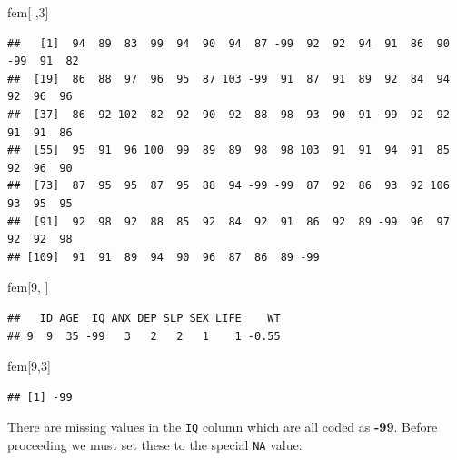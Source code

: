 \documentclass[
  12pt,
]{book}
\newenvironment{Shaded}{\begin{snugshade}}{\end{snugshade}}
\newcommand{\ConstantTok}[1]{\textcolor[rgb]{0.00,0.00,0.00}{#1}}
\newcommand{\DecValTok}[1]{\textcolor[rgb]{0.00,0.00,0.81}{#1}}
\newcommand{\NormalTok}[1]{#1}
\newcommand{\OtherTok}[1]{\textcolor[rgb]{0.56,0.35,0.01}{#1}}
\newcommand{\SpecialCharTok}[1]{\textcolor[rgb]{0.00,0.00,0.00}{#1}}
\begin{document}
\begin{Shaded}
\begin{Highlighting}[]
\NormalTok{fem[ ,}\DecValTok{3}\NormalTok{]}
\end{Highlighting}
\end{Shaded}

\begin{verbatim}
##   [1]  94  89  83  99  94  90  94  87 -99  92  92  94  91  86  90 -99  91  82
##  [19]  86  88  97  96  95  87 103 -99  91  87  91  89  92  84  94  92  96  96
##  [37]  86  92 102  82  92  90  92  88  98  93  90  91 -99  92  92  91  91  86
##  [55]  95  91  96 100  99  89  89  98  98 103  91  91  94  91  85  92  96  90
##  [73]  87  95  95  87  95  88  94 -99 -99  87  92  86  93  92 106  93  95  95
##  [91]  92  98  92  88  85  92  84  92  91  86  92  89 -99  96  97  92  92  98
## [109]  91  91  89  94  90  96  87  86  89 -99
\end{verbatim}

\begin{Shaded}
\begin{Highlighting}[]
\NormalTok{fem[}\DecValTok{9}\NormalTok{, ]}
\end{Highlighting}
\end{Shaded}

\begin{verbatim}
##   ID AGE  IQ ANX DEP SLP SEX LIFE    WT
## 9  9  35 -99   3   2   2   1    1 -0.55
\end{verbatim}

\begin{Shaded}
\begin{Highlighting}[]
\NormalTok{fem[}\DecValTok{9}\NormalTok{,}\DecValTok{3}\NormalTok{]}
\end{Highlighting}
\end{Shaded}

\begin{verbatim}
## [1] -99
\end{verbatim}

There are missing values in the \texttt{IQ} column which are all coded as \textbf{-99}. Before proceeding we must set these to
the special \texttt{NA} value:

\begin{Shaded}
\end{Shaded}
\end{document}
